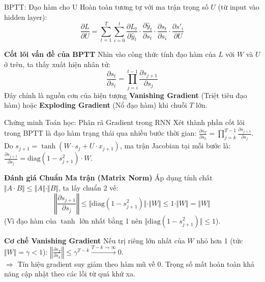 \begin{frame}{BPTT: Đạo hàm cho U}
\small
Hoàn toàn tương tự với ma trận trọng số $U$ (từ input vào hidden layer):
\[ \frac{\partial L}{\partial U} = \sum_{t=1}^{T} \sum_{i=0}^{t} \frac{\partial L_t}{\partial \hat{y}_t} \cdot \frac{\partial \hat{y}_t}{\partial s_t} \cdot \frac{\partial s_t}{\partial s_i} \cdot \frac{\partial s'_i}{\partial U} \]

\vspace{0.4cm}
\begin{alertblock}{\textbf{Cốt lõi vấn đề của BPTT}}
Nhìn vào công thức tính đạo hàm của $L$ với $W$ và $U$ ở trên, ta thấy xuất hiện nhân tử:
\[ \frac{\partial s_t}{\partial s_i} = \prod_{j=i}^{t-1} \frac{\partial s_{j+1}}{\partial s_j} \]
Đây chính là nguồn cơn của hiện tượng \textbf{Vanishing Gradient} (Triệt tiêu đạo hàm) hoặc \textbf{Exploding Gradient} (Nổ đạo hàm) khi chuỗi $T$ lớn.
\end{alertblock}
\end{frame}

\begin{frame}{Chứng minh Toán học: Phân rã Gradient trong RNN}
\footnotesize
Xét thành phần cốt lõi trong BPTT là đạo hàm trạng thái qua nhiều bước thời gian: $\frac{\partial s_T}{\partial s_k} = \prod_{j=k}^{T-1} \frac{\partial s_{j+1}}{\partial s_j}$.\\[0.1cm]
Do $s_{j+1} = \tanh(W \cdot s_j + U \cdot x_{j+1})$, ma trận Jacobian tại mỗi bước là: $\frac{\partial s_{j+1}}{\partial s_j} = \text{diag}(1 - s_{j+1}^2) \cdot W$.

\vspace{0.05cm}
\begin{block}{\textbf{Đánh giá Chuẩn Ma trận (Matrix Norm)}}
Áp dụng tính chất $\Vert A \cdot B \Vert \le \Vert A \Vert \cdot \Vert B \Vert$, ta lấy chuẩn 2 vế:
\[ \left\Vert \frac{\partial s_{j+1}}{\partial s_j} \right\Vert \le \Vert \text{diag}(1 - s_{j+1}^2) \Vert \cdot \Vert W \Vert \le 1 \cdot \Vert W \Vert = \Vert W \Vert \]
(Vì đạo hàm của $\tanh$ lớn nhất bằng 1 nên $\Vert \text{diag}(1 - s_{j+1}^2) \Vert \le 1$).
\end{block}

\vspace{0.05cm}
\begin{alertblock}{\textbf{Cơ chế Vanishing Gradient}}
Nếu trị riêng lớn nhất của $W$ nhỏ hơn 1 (tức $\Vert W \Vert = \gamma < 1$): $\left\Vert \frac{\partial s_T}{\partial s_k} \right\Vert \le \gamma^{T-k} \xrightarrow{T-k \to \infty} 0$.\\[0.1cm]
$\Rightarrow$ Tín hiệu gradient suy giảm theo hàm mũ về 0. Trọng số mất hoàn toàn khả năng cập nhật theo các lỗi từ quá khứ xa.
\end{alertblock}
\end{frame}

